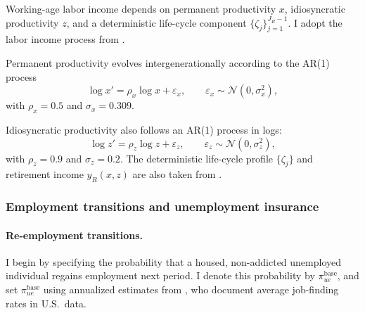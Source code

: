 \documentclass[parskip=full]{article}
\theoremstyle{plain}
\theoremstyle{definition}
\theoremstyle{remark}
\begin{document}
Working-age labor income depends on permanent productivity $x$, idiosyncratic productivity $z$, and a deterministic life-cycle component $\{\zeta_j\}_{j=1}^{J_R-1}$. I adopt the labor income process from \citet{gkkoc}.

Permanent productivity evolves intergenerationally according to the AR(1) process
\begin{equation*}
\log x' = \rho_x \log x + \varepsilon_x,
\qquad
\varepsilon_x \sim \mathcal{N}(0,\sigma_x^2),
\end{equation*}
with $\rho_x=0.5$ and $\sigma_x=0.309$.

Idiosyncratic productivity also follows an AR(1) process in logs:
\begin{equation*}
\log z' = \rho_z \log z + \varepsilon_z,
\qquad
\varepsilon_z \sim \mathcal{N}(0,\sigma_z^2),
\end{equation*}
with $\rho_z=0.9$ and $\sigma_z=0.2$. The deterministic life-cycle profile $\{\zeta_j\}$ and retirement income $y_R(x,z)$ are also taken from \citet{gkkoc}.

\subsubsection{Employment transitions and unemployment insurance}
\label{sec:cal_employment}

\paragraph{Re-employment transitions.}
I begin by specifying the probability that a housed, non-addicted unemployed individual regains employment next period. I denote this probability by $\pi_{ue}^{\text{base}}$, and set $\pi_{ue}^{\text{base}}$ using annualized estimates from \citet{kruegeretal-2016}, who document average job-finding rates in U.S.\ data.
\end{document}

